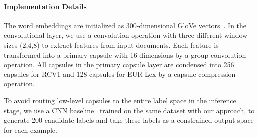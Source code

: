 \documentclass[11pt,a4paper]{article}
\newcommand{\1}{\boldsymbol{1}}
\begin{document}
\paragraph{Implementation Details} The word embeddings are initialized as 300-dimensional GloVe vectors~\cite{pennington2014glove}. In the convolutional layer, we use a convolution operation with three different window sizes 
(2,4,8) to extract features from input documents. Each feature is transformed into a primary capsule with 16 dimensions by a group-convolution operation. All capsules in the primary capsule layer are condensed into 256 capsules for RCV1 and 128 capsules for EUR-Lex by a capsule compression operation.

To avoid routing low-level capsules to the entire label space in the inference stage, we use a CNN baseline~\citep{kim2014convolutional} trained on the same dataset with our approach, to generate 200 candidate labels and take these labels as a constrained output space for each example. 
\end{document}
